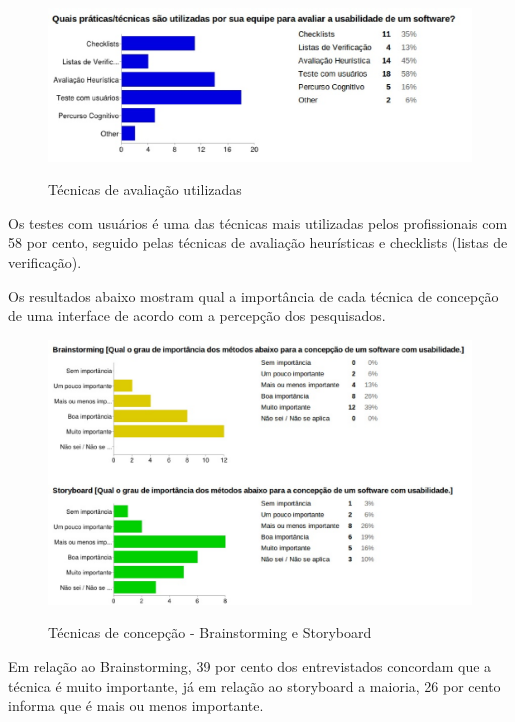 	\begin{figure}[!h]
    	\centering
    	\includegraphics[keepaspectratio=true,scale=0.55]
      		{figuras/avaliacao_usada.eps}
    	\label{concepcao}
		\caption{Técnicas de avaliação utilizadas}
	\end{figure}	
	
	Os testes com usuários é uma das técnicas mais utilizadas pelos profissionais com 58 por cento, seguido pelas técnicas de avaliação heurísticas e checklists (listas de verificação). 
	
\newpage

	Os resultados abaixo mostram qual a importância de cada técnica de concepção de uma interface de acordo com a percepção dos pesquisados.
	
	\begin{figure}[!h]
    	\centering
    	\includegraphics[keepaspectratio=true,scale=0.55]
      		{figuras/concepcao1.eps}
    	\label{concepcao}
		\caption{Técnicas de concepção - Brainstorming e Storyboard}
	\end{figure}
	
	Em relação ao Brainstorming, 39 por cento dos entrevistados concordam que a técnica é muito importante, já em relação ao storyboard a maioria, 26 por cento informa que é mais ou menos importante. 
	
